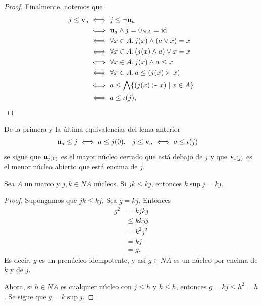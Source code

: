 \begin{proof}
    Finalmente, notemos que
    \begin{align}
      j\leq \mathbf v_{a}
      &\iff j\leq\neg\mathbf u_{a} \\
      &\iff \mathbf u_{a}\wedge j=0_{NA}=\mathrm{id} \\
      &\iff \forall x\in A, j(x)\wedge(a\vee x)=x \\
      &\iff \forall x\in A, (j(x)\wedge a)\vee x=x \\
      &\iff \forall x\in A, j(x)\wedge a\leq x \\
      &\iff \forall x\in A, a\leq (j(x)\succ x) \\
      &\iff a\leq\bigwedge\{(j(x)\succ x)\mid x\in A\} \\
      &\iff a\leq\iota(j),
    \end{align}
\end{proof}
\begin{cor}
  De la primera y la última equivalencias del lema anterior
  \begin{align}
    \mathbf u_{a}\leq j &\iff a\leq j(0), &
    j\leq \mathbf v_{a} &\iff a\leq\iota(j)
  \end{align}
  se sigue que $\mathbf u_{j(0)}$ es el mayor núcleo cerrado que está
  debajo de $j$ y que $\mathbf v_{\iota(j)}$ es el menor núcleo abierto
  que está encima de $j$.
\end{cor}

\begin{lemma}\label{lemma:sup-is-comp}
  Sea $A$ un marco y $j,k\in NA$ núcleos.
  Si $jk\leq kj$, entonces $k\sup j = kj$.
\end{lemma}
\begin{proof}
  Supongamos que $jk\leq kj$.
  Sea $g=kj$.
  Entonces
  \begin{align*}
    g^2
    &= kjkj \\
    &\leq kkjj \\
    &= k^2j^2 \\
    &= kj \\
    &= g.
  \end{align*}
  Es decir, $g$ es un prenúcleo idempotente, y así $g\in NA$
  es un núcleo por encima de $k$ y de $j$.

  Ahora, si $h\in NA$ es cualquier núcleo con $j\leq h$ y $k\leq
  h$, entonces $g=kj\leq h^2=h$.
  Se sigue que $g=k\sup j$.
\end{proof}

